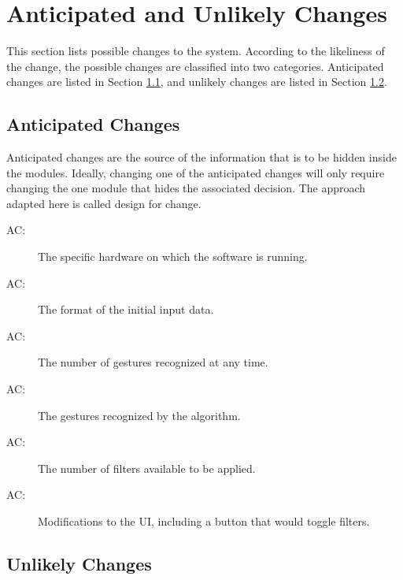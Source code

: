 \documentclass[12pt, titlepage]{article}
\newcounter{acnum}
\newcommand{\actheacnum}{AC\theacnum}
\begin{document}
\section{Anticipated and Unlikely Changes} \label{SecChange}

This section lists possible changes to the system. According to the likeliness
of the change, the possible changes are classified into two
categories. Anticipated changes are listed in Section \ref{SecAchange}, and
unlikely changes are listed in Section \ref{SecUchange}.

\subsection{Anticipated Changes} \label{SecAchange}

Anticipated changes are the source of the information that is to be hidden
inside the modules. Ideally, changing one of the anticipated changes will only
require changing the one module that hides the associated decision. The approach
adapted here is called design for
change.


\begin{description}
\item[ \actheacnum \label{acHardware}:] The specific
  hardware on which the software is running.
\item[ \actheacnum \label{acInput}:] The format of the
  initial input data.
\item[ \actheacnum \label{acGestureNumber}:] The number of gestures recognized at any time.
\item[ \actheacnum \label{acGesture}:] The gestures recognized by the algorithm.
\item[ \actheacnum \label{acFilterNumber}:] The number of filters available to be applied. 
\item[ \actheacnum \label{acUI}:] Modifications to the UI, including a button that would toggle filters. 
\end{description}

\subsection{Unlikely Changes} \label{SecUchange}
\end{document}
